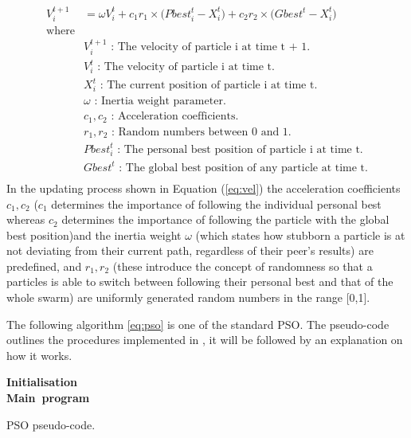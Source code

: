     \begin{equation} \label{eq:vel}
      \begin{split}
        V_{i}^{t+1} & = \omega V_{i}^{t} + c_1 r_1 \times \Big( Pbest_{i}^{t} - X_{i}^{t} \Big) + c_2 r_2 \times \Big( Gbest^{t} - X_{i}^{t} \Big) \\
        \text{where} & \\
        & V_i^{t+1} \text{ : The velocity of particle i at time t + 1.} \\
        & V_i^t \text{ : The velocity of particle i at time t.} \\
        & X_i^t \text{ : The current position of particle i at time t.} \\
        & \omega \text{ : Inertia weight parameter.} \\
        & c_1, c_2 \text{ : Acceleration coefficients.} \\
        & r_1, r_2 \text{ : Random numbers between 0 and 1.} \\
        & Pbest_i^t \text{ : The personal best position of particle i at time t.} \\
        & Gbest^t \text{ : The global best position of any particle at time t.} \\
      \end{split}
    \end{equation}
  In the updating process shown in Equation (\ref{eq:vel}) the acceleration coefficients $c_1, c_2$ ($c_1$ determines the importance of following the individual personal best whereas $c_2$ determines the importance of following the particle with the global best position)and the inertia weight $\omega$ (which states how stubborn a particle is at not deviating from their current path, regardless of their peer's results) are predefined, and $r_1, r_2$ (these introduce the concept of randomness so that a particles is able to switch between following their personal best and that of the whole swarm) are uniformly generated random numbers in the range [0,1].

  The following algorithm \ref{eq:pso} is one of the standard PSO. The pseudo-code outlines the procedures implemented in \cite{haskellPSO}, it will be followed by an explanation on how it works.\\
  \begin{algorithm}[H] \label{eq:pso}
    \mbox{\textbf{Initialisation}} \\
    \mbox{\textbf{Main program}} \\      
    \caption{PSO pseudo-code.}
  \end{algorithm}
  
